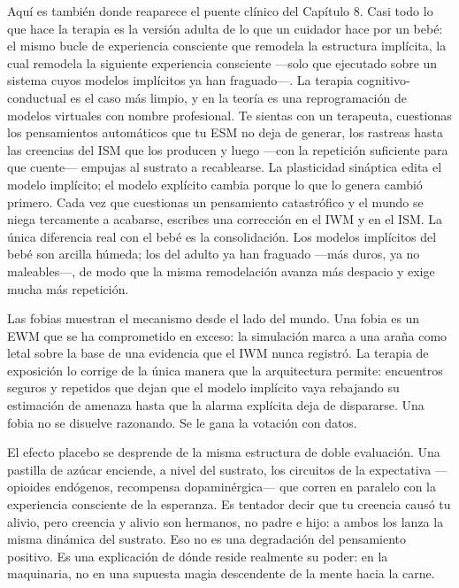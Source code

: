 \documentclass[11pt, twoside, openright]{book}
\begin{document}
Aquí es también donde reaparece el puente clínico del Capítulo 8. Casi todo lo que hace la terapia es la versión adulta de lo que un cuidador hace por un bebé: el mismo bucle de experiencia consciente que remodela la estructura implícita, la cual remodela la siguiente experiencia consciente ---solo que ejecutado sobre un sistema cuyos modelos implícitos ya han fraguado---. La terapia cognitivo-conductual es el caso más limpio, y en la teoría es una reprogramación de modelos virtuales con nombre profesional. Te sientas con un terapeuta, cuestionas los pensamientos automáticos que tu ESM no deja de generar, los rastreas hasta las creencias del ISM que los producen y luego ---con la repetición suficiente para que cuente--- empujas al sustrato a recablearse. La plasticidad sináptica edita el modelo implícito; el modelo explícito cambia porque lo que lo genera cambió primero. Cada vez que cuestionas un pensamiento catastrófico y el mundo se niega tercamente a acabarse, escribes una corrección en el IWM y en el ISM. La única diferencia real con el bebé es la consolidación. Los modelos implícitos del bebé son arcilla húmeda; los del adulto ya han fraguado ---más duros, ya no maleables---, de modo que la misma remodelación avanza más despacio y exige mucha más repetición.

Las fobias muestran el mecanismo desde el lado del mundo. Una fobia es un EWM que se ha comprometido en exceso: la simulación marca a una araña como letal sobre la base de una evidencia que el IWM nunca registró. La terapia de exposición lo corrige de la única manera que la arquitectura permite: encuentros seguros y repetidos que dejan que el modelo implícito vaya rebajando su estimación de amenaza hasta que la alarma explícita deja de dispararse. Una fobia no se disuelve razonando. Se le gana la votación con datos.

El efecto placebo se desprende de la misma estructura de doble evaluación. Una pastilla de azúcar enciende, a nivel del sustrato, los circuitos de la expectativa ---opioides endógenos, recompensa dopaminérgica--- que corren en paralelo con la experiencia consciente de la esperanza. Es tentador decir que tu creencia causó tu alivio, pero creencia y alivio son hermanos, no padre e hijo: a ambos los lanza la misma dinámica del sustrato. Eso no es una degradación del pensamiento positivo. Es una explicación de dónde reside realmente su poder: en la maquinaria, no en una supuesta magia descendente de la mente hacia la carne.
\end{document}
